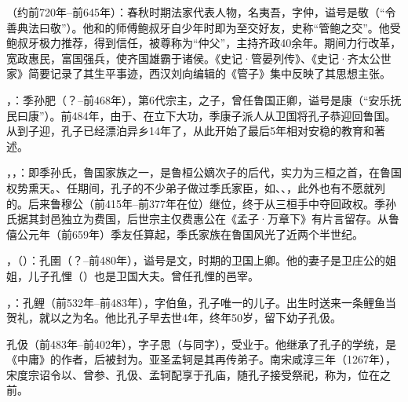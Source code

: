 （约前720年--前645年）：春秋时期法家代表人物，名夷吾，字仲，谥号是敬（“令善典法曰敬”）。他和的师傅鲍叔牙自少年时即为至交好友，史称“管鲍之交”。他受鲍叔牙极力推荐，得到信任，被尊称为“仲父”，主持齐政40余年。期间力行改革，宽政惠民，富国强兵，使齐国雄霸于诸侯。《史记·管晏列传》、《史记·齐太公世家》简要记录了其生平事迹，西汉刘向编辑的《管子》集中反映了其思想主张。%

，：季孙肥（？--前468年），第6代宗主，之子，曾任鲁国正卿，谥号是康（“安乐抚民曰康”）。前484年，由于、在立下大功，季康子派人从卫国将孔子恭迎回鲁国。从到子迎，孔子已经漂泊异乡14年了，从此开始了最后5年相对安稳的教育和著述。

，，：即季孙氏，鲁国家族之一，是鲁桓公嫡次子的后代，实力为三桓之首，在鲁国权势熏天。、任期间，孔子的不少弟子做过季氏家臣，如、、，此外也有不愿就列的。后来鲁穆公（前415年--前377年在位）继位，终于从三桓手中夺回政权。季孙氏据其封邑独立为费国，后世宗主仅费惠公在《孟子·万章下》有片言留存。从鲁僖公元年（前659年）季友任算起，季氏家族在鲁国风光了近两个半世纪。

，（）：孔圉（？--前480年），谥号是文，时期的卫国上卿。他的妻子是卫庄公的姐姐，儿子孔悝（）也是卫国大夫。曾任孔悝的邑宰。

，：孔鲤（前532年--前483年），字伯鱼，孔子唯一的儿子。出生时送来一条鲤鱼当贺礼，就以之为名。他比孔子早去世4年，终年50岁，留下幼子孔伋。

孔伋（前483年--前402年），字子思（与同字），受业于。他继承了孔子的学统，是《中庸》的作者，后被封为。亚圣孟轲是其再传弟子。南宋咸淳三年（1267年），宋度宗诏令以、曾参、孔伋、孟轲配享于孔庙，随孔子接受祭祀，称为，位在之前。

